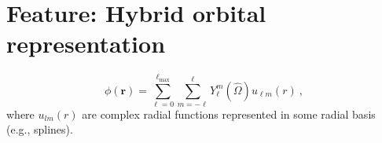 \section{Feature: Hybrid orbital representation}


\renewcommand{\vr}{\mathbf{r}}

\begin{equation}
\phi(\vr) = \sum_{\ell=0}^{\ell_\text{max}} \sum_{m=-\ell}^\ell Y_\ell^m (\hat{\Omega})
u_{\ell m}(r)\:,
\end{equation}
where $u_{lm}(r)$ are complex radial functions represented in some
radial basis (e.g., splines).

